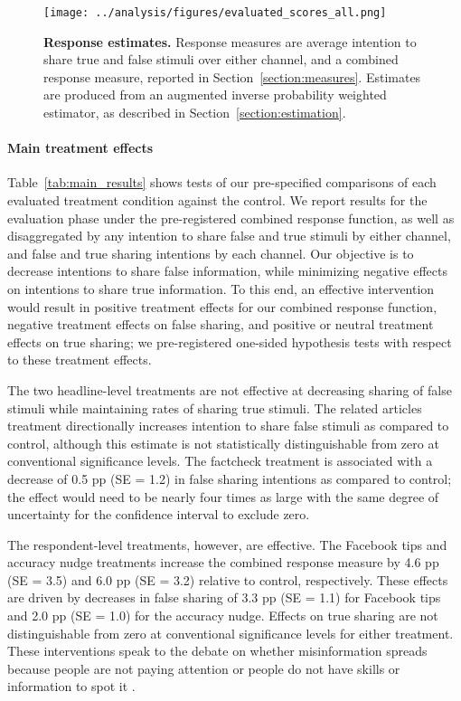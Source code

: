 \documentclass[letterpaper, 12pt, parskip=full,DIV=10]{scrartcl}
\begin{document}
\begin{figure}[H]
\texttt{[image: ../analysis/figures/evaluated\_scores\_all.png]}
\caption{\textbf{Response estimates.} Response measures are average intention to share true and false stimuli over either channel, and a combined response measure, reported in Section~\ref{section:measures}. Estimates are produced from an augmented inverse probability weighted estimator, as described in Section~\ref{section:estimation}.}
\label{fig:main_results}
\end{figure}


\paragraph{Main treatment effects}
Table~\ref{tab:main_results} shows tests of our pre-specified comparisons of each evaluated treatment condition against the control. We report results for the evaluation phase under the pre-registered combined response function, as well as disaggregated by any intention to share false and true stimuli by either channel, and false and true sharing intentions by each channel. Our objective is to decrease intentions to share false information, while minimizing negative effects on intentions to share true information. To this end, an effective intervention would result in positive treatment effects for our combined response function, negative treatment effects on false sharing, and positive or neutral treatment effects on true sharing; we pre-registered one-sided hypothesis tests with respect to these treatment effects. %

The two headline-level treatments are not effective at decreasing sharing of false stimuli while maintaining rates of sharing true stimuli. The related articles treatment directionally increases intention to share false stimuli as compared to control, although this estimate is not statistically distinguishable from zero at conventional significance levels. The factcheck treatment is associated with a decrease of 0.5 pp (SE = 1.2) in false sharing intentions as compared to control; the effect would need to be nearly four times as large with the same degree of uncertainty for the confidence interval to exclude zero.  %

The respondent-level treatments, however, are effective. The Facebook tips and accuracy nudge treatments increase the combined response measure by 4.6 pp (SE = 3.5) and 6.0 pp (SE = 3.2) relative to control, respectively. These effects are driven by decreases in false sharing of 3.3 pp (SE = 1.1) for Facebook tips and 2.0 pp (SE = 1.0) for the accuracy nudge. Effects on true sharing are not distinguishable from zero at conventional significance levels for either treatment. 
These interventions speak to the debate on whether misinformation spreads because people are not paying attention or people do not have skills or information to spot it \citep{ecker2022psychological}. 
\end{document}
